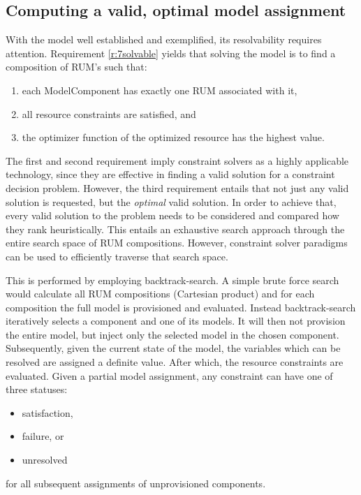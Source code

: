\subsection{Computing a valid, optimal model assignment}
With the model well established and exemplified, its resolvability requires attention. Requirement \ref{r:7solvable} yields that solving the model is to find a composition of RUM's such that:
\begin{enumerate}
\nospace
\item each ModelComponent has exactly one RUM associated with it,
\item all resource constraints are satisfied, and
\item the optimizer function of the optimized resource has the highest value.
\end{enumerate}
The first and second requirement imply constraint solvers as a highly applicable technology, since they are effective in finding a valid solution for a constraint decision problem. However, the third requirement entails that not just any valid solution is requested, but the \emph{optimal} valid solution. In order to achieve that, every valid solution to the problem needs to be considered and compared how they rank heuristically. This entails an exhaustive search approach through the entire search space of RUM compositions. However, constraint solver paradigms can be used to efficiently traverse that search space.

This is performed by employing backtrack-search. A simple brute force search would calculate all RUM compositions (Cartesian product) and for each composition the full model is provisioned and evaluated. Instead backtrack-search iteratively selects a component and one of its models. It will then not provision the entire model, but inject only the selected model in the chosen component. Subsequently, given the current state of the model, the variables which can be resolved are assigned a definite value. After which, the resource constraints are evaluated. Given a partial model assignment, any constraint can have one of three statuses:
\begin{itemize}
\nospace
\item satisfaction,
\item failure, or
\item unresolved
\end{itemize}
for all subsequent assignments of unprovisioned components.

